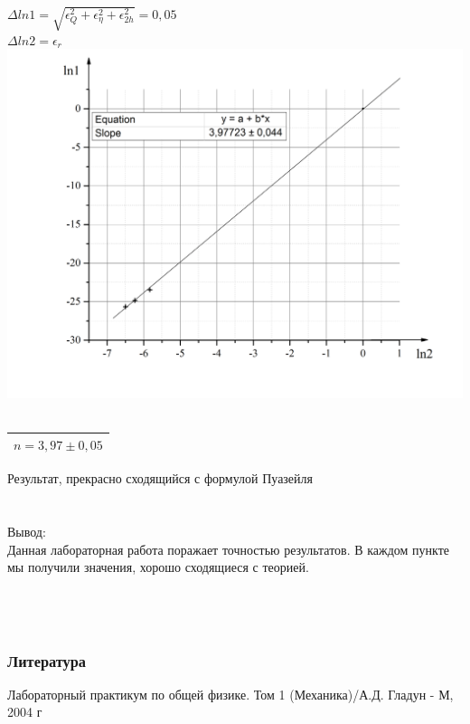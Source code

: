 \documentclass[11pt]{article}
\begin{document}
\ \\
$\Delta ln1 = \sqrt{\epsilon_Q^2+\epsilon_\eta^2+\epsilon_{2h}^2}=0,05$\\
$\Delta ln2 = \epsilon_r$
\ \\
\includegraphics[scale=0.55]{Graph3.jpg}
\ \\
\begin{tabular}{|c|}
\hline 
$n=3,97\pm0,05$ \\ 
\hline 
\end{tabular} 
Результат, прекрасно сходящийся с формулой Пуазейля \\
\ \\
\ \\
Вывод: \\
Данная лабораторная работа поражает точностью результатов. В каждом пункте мы получили значения, хорошо сходящиеся с теорией.
\ \\
\ \\
\ \\
\ \\
\indent \subsubsection*{Литература}
Лабораторный практикум по общей физике. Том 1 (Механика)/А.Д. Гладун - М, 2004 г\\
\end{document}
